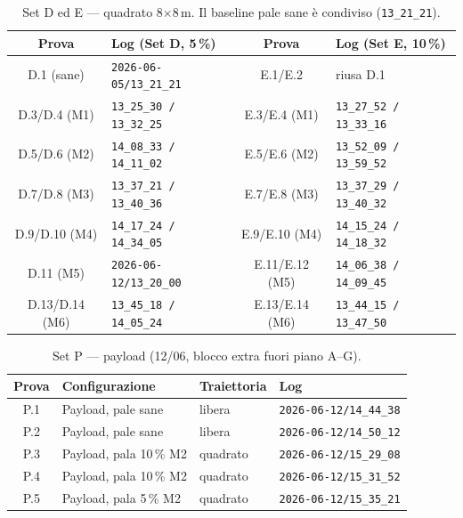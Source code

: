 \begin{table}[H]
\centering
\caption{Set D ed E --- quadrato 8$\times$8\,m. Il baseline pale sane \`e condiviso
(\texttt{13\_21\_21}).}
\label{tab:app-de}
\scriptsize
\begin{tabularx}{\linewidth}{@{}c l c l@{}}
\toprule
\textbf{Prova} & \textbf{Log (Set D, 5\,\%)} & \textbf{Prova} & \textbf{Log (Set E, 10\,\%)} \\
\midrule
D.1 (sane) & \texttt{2026-06-05/13\_21\_21} & E.1/E.2 & riusa D.1 \\
D.3/D.4 (M1) & \texttt{13\_25\_30 / 13\_32\_25} & E.3/E.4 (M1) & \texttt{13\_27\_52 / 13\_33\_16} \\
D.5/D.6 (M2) & \texttt{14\_08\_33 / 14\_11\_02} & E.5/E.6 (M2) & \texttt{13\_52\_09 / 13\_59\_52} \\
D.7/D.8 (M3) & \texttt{13\_37\_21 / 13\_40\_36} & E.7/E.8 (M3) & \texttt{13\_37\_29 / 13\_40\_32} \\
D.9/D.10 (M4) & \texttt{14\_17\_24 / 14\_34\_05} & E.9/E.10 (M4) & \texttt{14\_15\_24 / 14\_18\_32} \\
D.11 (M5) & \texttt{2026-06-12/13\_20\_00} & E.11/E.12 (M5) & \texttt{14\_06\_38 / 14\_09\_45} \\
D.13/D.14 (M6) & \texttt{13\_45\_18 / 14\_05\_24} & E.13/E.14 (M6) & \texttt{13\_44\_15 / 13\_47\_50} \\
\bottomrule
\end{tabularx}
\end{table}

\begin{table}[H]
\centering
\caption{Set P --- payload (12/06, blocco extra fuori piano A--G).}
\label{tab:app-p}
\scriptsize
\begin{tabularx}{\linewidth}{@{}c L{4.4cm} l l@{}}
\toprule
\textbf{Prova} & \textbf{Configurazione} & \textbf{Traiettoria} & \textbf{Log} \\
\midrule
P.1 & Payload, pale sane & libera & \texttt{2026-06-12/14\_44\_38} \\
P.2 & Payload, pale sane & libera & \texttt{2026-06-12/14\_50\_12} \\
P.3 & Payload, pala 10\,\% M2 & quadrato & \texttt{2026-06-12/15\_29\_08} \\
P.4 & Payload, pala 10\,\% M2 & quadrato & \texttt{2026-06-12/15\_31\_52} \\
P.5 & Payload, pala 5\,\% M2 & quadrato & \texttt{2026-06-12/15\_35\_21} \\
\bottomrule
\end{tabularx}
\end{table}

